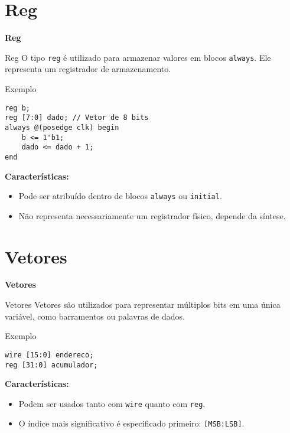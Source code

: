 \documentclass[aspectratio=169,xcolor=dvipsnames]{beamer}
\begin{document}
\section{Reg}

\begin{frame}
    \Huge{\centerline{\textbf{Reg}}}
\end{frame}

\begin{frame}[fragile]{Reg}
O tipo \texttt{reg} é utilizado para armazenar valores em blocos \texttt{always}. Ele representa um registrador de armazenamento.

\begin{block}{Exemplo}
\begin{verbatim}
reg b;
reg [7:0] dado; // Vetor de 8 bits
always @(posedge clk) begin
    b <= 1'b1;
    dado <= dado + 1;
end
\end{verbatim}
\end{block}

\textbf{Características:}
\begin{itemize}
    \item Pode ser atribuído dentro de blocos \texttt{always} ou \texttt{initial}.
    \item Não representa necessariamente um registrador físico, depende da síntese.
\end{itemize}
\end{frame}

\section{Vetores}

\begin{frame}
    \Huge{\centerline{\textbf{Vetores}}}
\end{frame}

\begin{frame}[fragile]{Vetores}
Vetores são utilizados para representar múltiplos bits em uma única variável, como barramentos ou palavras de dados.

\begin{block}{Exemplo}
\begin{verbatim}
wire [15:0] endereco;
reg [31:0] acumulador;
\end{verbatim}
\end{block}

\textbf{Características:}
\begin{itemize}
    \item Podem ser usados tanto com \texttt{wire} quanto com \texttt{reg}.
    \item O índice mais significativo é especificado primeiro: \texttt{[MSB:LSB]}.
\end{itemize}
\end{frame}
\end{document}
